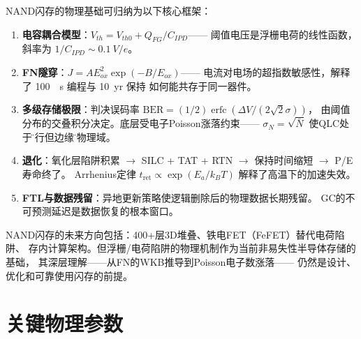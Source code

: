 \documentclass[11pt,a4paper,twoside]{article}
\theoremstyle{definition}
\theoremstyle{plain}
\theoremstyle{remark}
\begin{document}
NAND闪存的物理基础可归纳为以下核心框架：

\begin{enumerate}
  \item \textbf{电容耦合模型}：$V_{th} = V_{th0} + Q_{FG}/C_{IPD}$——
  阈值电压是浮栅电荷的线性函数，斜率为 $1/C_{IPD} \sim \SI{0.1}{V/e}$。

  \item \textbf{FN隧穿}：$J = A E_{ox}^2 \exp(-B/E_{ox})$——
  电流对电场的超指数敏感性，解释了 \SI{100}{\mu s} 编程与 \SI{10}{yr} 保持
  如何能共存于同一器件。

  \item \textbf{多级存储极限}：判决误码率
  $\text{BER} = (1/2)\operatorname{erfc}(\Delta V/(2\sqrt{2}\sigma))$，
  由阈值分布的交叠积分决定。底层受电子Poisson涨落约束——
  $\sigma_N = \sqrt{\bar{N}}$ 使QLC处于\"可行但边缘\"的物理域。

  \item \textbf{退化}：氧化层陷阱积累 $\to$ SILC + TAT + RTN
  $\to$ 保持时间缩短 $\to$ P/E寿命终了。
  Arrhenius定律 $t_{\text{ret}} \propto \exp(E_a/k_B T)$
  解释了高温下的加速失效。

  \item \textbf{FTL与数据残留}：异地更新策略使逻辑删除后的物理数据长期残留。
  GC的不可预测延迟是数据恢复的根本窗口。
\end{enumerate}

NAND闪存的未来方向包括：400+层3D堆叠、铁电FET（FeFET）替代电荷陷阱、
存内计算架构。但浮栅/电荷陷阱的物理机制作为当前非易失性半导体存储的基础，
其深层理解——从FN的WKB推导到Poisson电子数涨落——
仍然是设计、优化和可靠使用闪存的前提。

\appendix
\section{关键物理参数}
\end{document}
